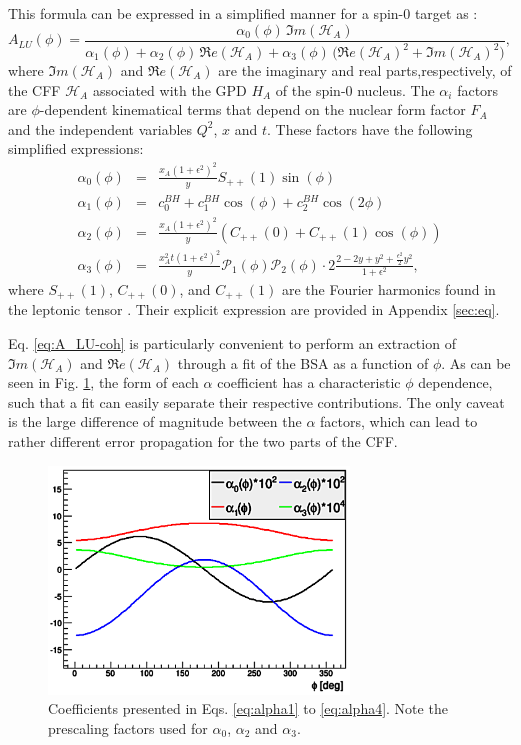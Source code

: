 \documentclass[aps,prc,preprint,superscriptaddress]{revtex4}
\begin{document}
This formula can be expressed in a simplified manner for a spin-0 target as \cite{Belitsky:2008bz}:
\begin{equation}
A_{LU}(\phi) = \frac{\alpha_{0}(\phi) \, \Im m(\mathcal{H}_{A})}
{\alpha_{1}(\phi) + \alpha_{2}(\phi) \, \Re e(\mathcal{H}_{A}) + \alpha_{3}(\phi) \, 
\big( 
\Re e(\mathcal{H}_{A})^{2} + \Im m(\mathcal{H}_{A})^{2} \big)},
\label{eq:A_LU-coh}
\end{equation}
where $\Im m(\mathcal{H}_{A})$ and $\Re e(\mathcal{H}_{A})$ are the imaginary 
and real parts,respectively, of the CFF $\mathcal{H}_{A}$ associated with 
the GPD $H_A$ of the spin-0 nucleus. The 
$\alpha_{i}$ factors are $\phi$-dependent kinematical terms that depend on the 
nuclear form factor $F_A$ and the independent variables $Q^2$, $x$ and $t$.  
These factors have the following simplified expressions:
\begin{eqnarray}
	\label{eq:alpha1}
   \alpha_0 (\phi) & = &\frac{x_{A}(1+\epsilon^2)^2}{y} S_{++}(1) \sin(\phi)\\
    \alpha_1 (\phi) & = & c_0^{BH}+c_1^{BH} \cos({\phi})+c_2^{BH} \cos(2\phi)\\ 
   \alpha_2 (\phi) & = & \frac{x_{A}(1+\epsilon^2)^2}{y}  \left( C_{++}(0) +  
C_{++}(1) \cos(\phi) \right)\\
\alpha_3 (\phi) &=& \frac{x^{2}_{A}t(1+\epsilon^2)^2}{y} {\mathcal P}_1(\phi) 
{\mathcal P}_2(\phi) \cdot 2 \frac{2-2y+y^2 + \frac{\epsilon^2}{2}y^2}{1 + 
\epsilon^2},
	\label{eq:alpha4}
\end{eqnarray}
where $S_{++}(1)$, $C_{++}(0)$, and $C_{++}(1)$ are the Fourier harmonics found in the 
leptonic tensor \cite{Belitsky:2008bz}. Their explicit expression are provided in 
Appendix \ref{sec:eq}. 

Eq. \ref{eq:A_LU-coh} is particularly convenient to perform an extraction of 
$\Im m(\mathcal{H}_{A})$ and $\Re e(\mathcal{H}_{A})$ through a fit of the BSA as 
a function of $\phi$. As can be seen in Fig. \ref{fig:alphas}, the form of each 
$\alpha$ coefficient has a characteristic $\phi$ dependence, such that a fit can
easily separate their respective contributions. The only caveat
is the large difference of magnitude between the $\alpha$ factors, which can lead to 
rather different error propagation for the two parts of the CFF.

\begin{figure}[tbp!]
\center
\includegraphics[width=8cm]{AlphaCoefs.png}
	\caption{Coefficients presented in Eqs. \ref{eq:alpha1} to \ref{eq:alpha4}.
	Note the prescaling factors used for $\alpha_0$, $\alpha_2$ and $\alpha_3$.}
\label{fig:alphas}
\end{figure}
\end{document}
